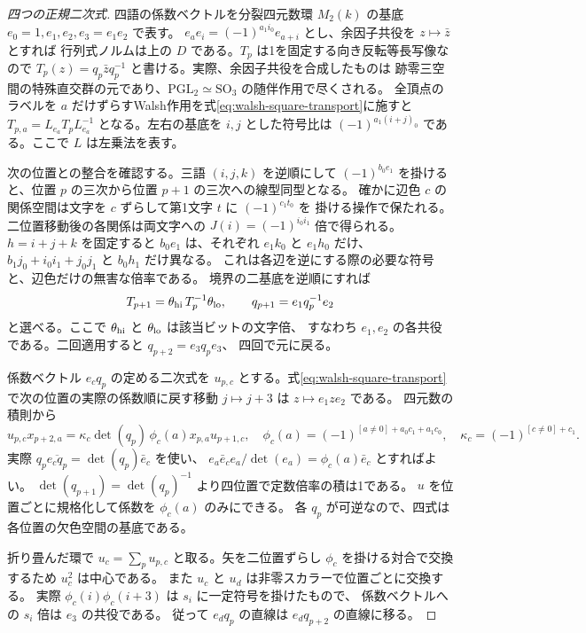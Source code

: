 \begin{proof}[四つの正規二次式]
四語の係数ベクトルを分裂四元数環 $M_2(k)$ の基底 $e_0=1,e_1,e_2,e_3=e_1e_2$ で表す。
$e_a e_i=(-1)^{a_1 i_0}e_{a+i}$ とし、余因子共役を $z\mapsto\bar z$ とすれば
行列式ノルムは上の $D$ である。$T_p$ は1を固定する向き反転等長写像なので
$T_p(z)=q_p\bar z q_p^{-1}$ と書ける。実際、余因子共役を合成したものは
跡零三空間の特殊直交群の元であり、$\mathrm{PGL}_2\simeq\mathrm{SO}_3$ の随伴作用で尽くされる。
全頂点のラベルを $a$ だけずらすWalsh作用を式\eqref{eq:walsh-square-transport}に施すと
$T_{p,a}=L_{e_a}T_p L_{e_a}^{-1}$ となる。左右の基底を $i,j$ とした符号比は
$(-1)^{a_1(i+j)_0}$ である。ここで $L$ は左乗法を表す。

次の位置との整合を確認する。三語 $(i,j,k)$ を逆順にして
$(-1)^{b_0 e_1}$ を掛けると、位置 $p$ の三次から位置 $p+1$ の三次への線型同型となる。
確かに辺色 $c$ の関係空間は文字を $c$ ずらして第1文字 $t$ に $(-1)^{c_1t_0}$ を
掛ける操作で保たれる。二位置移動後の各関係は両文字への $J(i)=(-1)^{i_0i_1}$ 倍で得られる。
$h=i+j+k$ を固定すると $b_0e_1$ は、それぞれ $e_1 k_0$ と $e_1h_0$ だけ、
$b_1j_0+i_0i_1+j_0j_1$ と $b_0h_1$ だけ異なる。
これは各辺を逆にする際の必要な符号と、辺色だけの無害な倍率である。
境界の二基底を逆順にすれば
\[
 T_{p+1}=\theta_{\rm hi}\,T_p^{-1}\theta_{\rm lo},
 \qquad q_{p+1}=e_1q_p^{-1}e_2
\]
と選べる。ここで $\theta_{\rm hi}$ と $\theta_{\rm lo}$ は該当ビットの文字倍、
すなわち $e_1,e_2$ の各共役である。二回適用すると $q_{p+2}=e_3q_pe_3$、
四回で元に戻る。

係数ベクトル $e_c q_p$ の定める二次式を $u_{p,c}$ とする。式\eqref{eq:walsh-square-transport}
で次の位置の実際の係数順に戻す移動 $j\mapsto j+3$ は $z\mapsto e_1 z e_2$ である。
四元数の積則から
\[
 u_{p,c}x_{p+2,a}=\kappa_c\det(q_p)\,\phi_c(a)x_{p,a}u_{p+1,c},
 \quad
 \phi_c(a)=(-1)^{[a\ne0]+a_0c_1+a_1c_0},\quad
 \kappa_c=(-1)^{[c\ne0]+c_1}.
\]
実際 $q_p\overline{e_c q_p}=\det(q_p)\bar e_c$ を使い、
$e_a\bar e_c e_a/\det(e_a)=\phi_c(a)\bar e_c$ とすればよい。
$\det(q_{p+1})=\det(q_p)^{-1}$ より四位置で定数倍率の積は1である。
$u$ を位置ごとに規格化して係数を $\phi_c(a)$ のみにできる。
各 $q_p$ が可逆なので、四式は各位置の欠色空間の基底である。

折り畳んだ環で $u_c=\sum_p u_{p,c}$ と取る。矢を二位置ずらし
$\phi_c$ を掛ける対合で交換するため $u_c^2$ は中心である。
また $u_c$ と $u_d$ は非零スカラーで位置ごとに交換する。
実際 $\phi_c(i)\phi_c(i+3)$ は $s_i$ に一定符号を掛けたもので、
係数ベクトルへの $s_i$ 倍は $e_3$ の共役である。
従って $e_d q_p$ の直線は $e_d q_{p+2}$ の直線に移る。
\end{proof}

